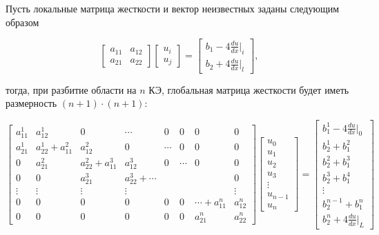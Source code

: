 Пусть локальные матрица жесткости и вектор неизвестных заданы следующим образом

$$
\begin{bmatrix}
a_{11}     &   a_{12}\\
a_{21}     &    a_{22}
\end{bmatrix}
\begin{bmatrix}
u_i \\
u_j
\end{bmatrix} =
\begin{bmatrix}
b_1   -4  \frac{du}{dx}|_i \\
b_2   +4  \frac{du}{dx}|_l
\end{bmatrix},$$

тогда, при разбитие области на $n$ КЭ, глобальная матрица жесткости  будет иметь размерность $(n+1)\cdot(n+1)$:

$$ \begin{bmatrix}
a_{11}^1     &   a_{12}^1         &   0 & \cdots & 0 & 0 & 0  & 0\\
a_{21}^1     &    a_{22}^1+a_{11}^2 & a_{12}^2  & 0 & \cdots & 0 & 0  & 0\\
0     &    a_{21}^2 & a_{22}^2+a_{11}^3  &  a_{12}^3  & 0 & \cdots & 0  & 0\\
0     &    0  & a_{21}^3  & a_{22}^3+ \cdots  &  & &   & 0\\
\vdots & \vdots & \vdots & \vdots &  &  &   & \vdots\\
0 & 0 & 0 & 0 &  0 & 0 & \cdots+a_{11}^n  & a_{12}^n\\
0 & 0 & 0 & 0 &  0 & 0 & a_{21}^n  & a_{22}^n
\end{bmatrix}
\begin{bmatrix}
u_0 \\
u_1 \\
u_2\\
u_3\\
\vdots\\
u_{n-1}\\
u_n
\end{bmatrix} =
\begin{bmatrix}
b_1^1   -4  \frac{du}{dx}|_0 \\
b_2^1+b_1^2\\
b_2^2+b_1^3\\
b_2^3+b_1^4\\
\vdots\\
b_2^{n-1}+b_1^n\\
b_2^n   +4  \frac{du}{dx}|_L
\end{bmatrix}
$$

